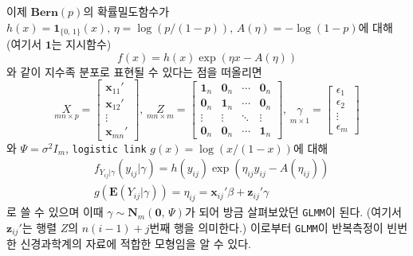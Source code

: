 \documentclass[11pt,onecolumn,twoside,a4size]{gsag3jnl}
\begin{document}
이제 $\mathbf{Bern}(p)$의 확률밀도함수가 $h(x)=\mathbf{1}_{\{0,\,1\}}(x),\,\eta=\log(p/(1-p)),\,A(\eta)=-\log(1-p)$에 대해 (여기서 $\mathbf{1}$는 지시함수)
\begin{equation}
  f(x)=h(x)\exp(\eta x-A(\eta))
\end{equation}
와 같이 지수족 분포로 표현될 수 있다는 점을 떠올리면
\begin{equation}
  \underset{mn\times p}{X}=\begin{bmatrix*}
    \mathbf{x}_{11}'\\
    \mathbf{x}_{12}'\\
    \vdots\\
    \mathbf{x}_{mn}'
  \end{bmatrix*},\,\underset{mn\times m}{Z}=\begin{bmatrix*}
    \mathbf{1}_n&\mathbf{0}_n&\cdots&\mathbf{0}_n\\
    \mathbf{0}_n&\mathbf{1}_n&\cdots&\mathbf{0}_n\\
    \vdots&\vdots&\ddots&\vdots\\
    \mathbf{0}_n&\mathbf{0}_n&\cdots&\mathbf{1}_n
  \end{bmatrix*},\,\underset{m\times1}{\gamma}=\begin{bmatrix*}
    \epsilon_1\\
    \epsilon_2\\
    \vdots\\
    \epsilon_m
  \end{bmatrix*}
\end{equation}
와 $\Psi=\sigma^2I_m$, \texttt{logistic link} $g(x)=\log(x/(1-x))$에 대해
\begin{align}
  &f_{Y_{ij}\vert\gamma}(y_{ij}\vert\gamma)=h(y_{ij})\exp(\eta_{ij}y_{ij}-A(\eta_{ij}))\\
  &g(\mathbf{E}(Y_{ij}\vert\gamma))=\eta_{ij}=\mathbf{x}_{ij}'\beta+\mathbf{z}_{ij}'\gamma\nonumber
\end{align}
로 쓸 수 있으며 이때 $\gamma\sim\mathbf{N}_{m}(\mathbf{0},\,\Psi)$가 되어 방금 살펴보았던 \texttt{GLMM}이 된다. (여기서 $\mathbf{z}_{ij}'$는 행렬 $Z$의 $n(i-1)+j$번째 행을 의미한다.) 이로부터 \texttt{GLMM}이 반복측정이 빈번한 신경과학계의 자료에 적합한 모형임을 알 수 있다.
\end{document}
